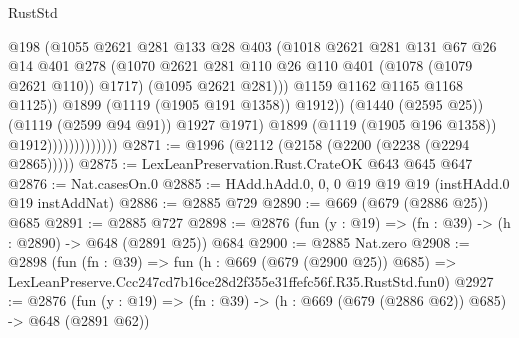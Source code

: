 \begin{lexlean}{RustStd}
\begin{coremodule}
                                        @198
                                        (@1055
                                          @2621
                                          @281
                                          @133
                                          @28
                                          @403
                                          (@1018
                                            @2621
                                            @281
                                            @131
                                            @67
                                            @26
                                            @14
                                            @401
                                            @278
                                            (@1070
                                              @2621
                                              @281
                                              @110
                                              @26
                                              @110
                                              @401
                                              (@1078 (@1079 @2621 @110))
                                              @1717)
                                            (@1095 @2621 @281)))
                                        @1159
                                        @1162
                                        @1165
                                        @1168
                                        @1125))
                                    @1899
                                    (@1119 (@1905 @191 @1358))
                                    @1912))
                                (@1440 (@2595 @25))
                                (@1119 (@2599 @94 @91))
                                @1927
                                @1971)
                              @1899
                              (@1119 (@1905 @196 @1358))
                              @1912)))))))))))))
@2871 := @1996 (@2112 (@2158 (@2200 (@2238 (@2294 @2865)))))
@2875 := LexLeanPreservation.Rust.CrateOK @643 @645 @647
@2876 := Nat.casesOn.{0}
@2885 := HAdd.hAdd.{0, 0, 0} @19 @19 @19 (instHAdd.{0} @19 instAddNat)
@2886 := @2885 @729
@2890 := @669 (@679 (@2886 @25)) @685
@2891 := @2885 @727
@2898 := @2876 (fun (y : @19) => (fn : @39) -> (h : @2890) -> @648 (@2891 @25)) @684
@2900 := @2885 Nat.zero
@2908 := @2898
    (fun (fn : @39) =>
    fun (h : @669 (@679 (@2900 @25)) @685) =>
    LexLeanPreserve.Ccc247cd7b16ce28d2f355e31ffefc56f.R35.RustStd.fun0)
@2927 := @2876
    (fun (y : @19) => (fn : @39) -> (h : @669 (@679 (@2886 @62)) @685) -> @648 (@2891 @62))

\end{coremodule}
\end{lexlean}
